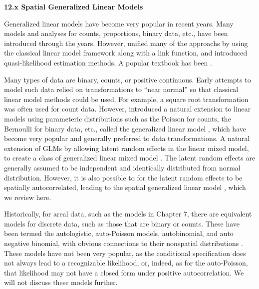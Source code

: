 \documentclass[12pt, titlepage]{article}
\begin{document}
\setcounter{equation}{0}
\renewcommand{\theequation}{12.\arabic{equation}}


%
%

{\Large \flushleft \textbf{12.x Spatial Generalized Linear Models}}

\vspace{.3cm}

Generalized linear models have become very popular in recent years.  Many models and analyses for counts, proportions, binary data, etc., have been introduced through the years.  However, \citet{NelderEtAl1972GeneralizedLinearModels370} unified many of the approachs by using the classical linear model framework along with a link function, and \citet{wedderburn_quasi-likelihood_1974} introduced quasi-likelihood estimation methods. A popular textbook has been \citet{McCullaghEtAl1989GeneralizedLinearModels}.

Many types of data are binary, counts, or positive continuous.  Early attempts to model such data relied on transformations to ``near normal'' so that classical linear model methods could be used.  For example, a square root transformation was often used for count data.  However, \citet{NelderEtAl1972GeneralizedLinearModels370} introduced a natural extension to linear models using parameteric distributions such as the Poisson for counts, the Bernoulli for binary data, etc., called the generalized linear model \citep[GLM,][]{McCullaghEtAl1989GeneralizedLinearModels}, which have become very popular and generally preferred to data transformations.  A natural extension of GLMs by allowing latent random effects in the linear mixed model, to create a class of generalized linear mixed model \citep[GLMM,][]{breslow_approximate_1993}.  The latent random effects are generally assumed to be independent and identically distributed from normal distribution.  However, it is also possible to for the latent random effects to be spatially autocorrelated, leading to the spatial generalized linear model \citep[SGLM,][]{GotwayEtAl1997GeneralizedLinearModel157, DiggleEtAl1998ModelbasedGeostatisticsDisc299}, which we review here.

Historically, for areal data, such as the models in Chapter 7, there are equivalent models for discrete data, such as those that are binary or counts.  These have been termed the autologistic, auto-Poisson models, autobinomial, and auto negative binomial, with obvious connections to their nonspatial distributions \citep{Besag1974SpatialInteractionStatistical192, Cressie1993StatisticsSpatialData}.  These models have not been very popular, as the conditional specification does not always lead to a recognizable likelihood, or, indeed, as for the auto-Poisson, that likelihood may not have a closed form under positive autocorrelation.  We will not discuss these models further.
\end{document}
